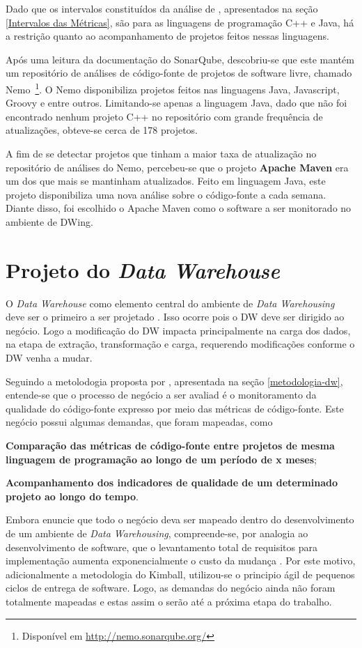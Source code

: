 Dado que os intervalos constituídos da análise de , apresentados na seção \ref{Intervalos das Métricas}, são para as linguagens de programação C++ e Java, há a restrição quanto ao acompanhamento de projetos feitos nessas linguagens.

Após uma leitura da documentação do SonarQube, descobriu-se que este mantém um repositório de análises de código-fonte de projetos de software livre, chamado Nemo~\footnote{Disponível em \url{http://nemo.sonarqube.org/}}. O Nemo disponibiliza projetos feitos nas linguagens Java, Javascript, Groovy e entre outros. Limitando-se apenas a linguagem Java, dado que não foi encontrado nenhum projeto C++ no repositório com grande frequência de atualizações, obteve-se cerca de 178 projetos.

A fim de se detectar projetos que tinham a maior taxa de atualização no repositório de análises do Nemo, percebeu-se que o projeto \textbf{Apache Maven} era um dos que mais se mantinham atualizados. Feito em linguagem Java, este projeto disponibiliza uma nova análise sobre o código-fonte a cada semana. Diante disso, foi escolhido o Apache Maven como o software a ser monitorado no ambiente de DWing. 


\section{Projeto do \textit{Data Warehouse}}

O \textit{Data Warehouse} como elemento central do ambiente de \textit{Data Warehousing} deve ser o primeiro a ser projetado \cite{Kimball2002}. Isso ocorre pois o DW deve ser dirigido ao negócio. Logo a modificação do DW impacta principalmente na carga dos dados, na etapa de extração, transformação e carga, requerendo modificações conforme o DW venha a mudar.

Seguindo a metolodogia proposta por , apresentada na seção \ref{metodologia-dw}, entende-se que o processo de negócio a ser avaliad é o monitoramento da qualidade do código-fonte expresso por meio das métricas de código-fonte. Este negócio possui algumas demandas, que foram mapeadas, como \begin{inparaenum}[i)] \item 
\textbf{Comparação das métricas de código-fonte entre projetos de mesma linguagem de programação ao longo de um período de x meses}; \item \textbf{Acompanhamento dos indicadores de qualidade de um determinado projeto ao longo do tempo}.
\end{inparaenum} 
Embora  enuncie que todo o negócio deva ser mapeado dentro do desenvolvimento de um ambiente de \textit{Data Warehousing}, compreende-se, por analogia ao desenvolvimento de software, que o levantamento total de requisitos para implementação aumenta exponencialmente o custo da mudança \cite{beck1999}. Por este motivo, adicionalmente a metodologia do Kimball, utilizou-se o principio ágil de pequenos ciclos de entrega de software. Logo, as demandas do negócio ainda não foram totalmente mapeadas e estas assim o serão até a próxima etapa do trabalho.


